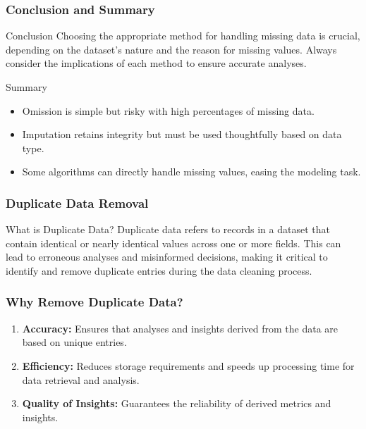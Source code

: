 \documentclass[aspectratio=169]{beamer}
\begin{document}
\begin{frame}[fragile]
    \frametitle{Conclusion and Summary}
    \begin{block}{Conclusion}
        Choosing the appropriate method for handling missing data is crucial, depending on the dataset's nature and the reason for missing values. Always consider the implications of each method to ensure accurate analyses.
    \end{block}
    
    \begin{block}{Summary}
        \begin{itemize}
            \item Omission is simple but risky with high percentages of missing data.
            \item Imputation retains integrity but must be used thoughtfully based on data type.
            \item Some algorithms can directly handle missing values, easing the modeling task.
        \end{itemize}
    \end{block}
\end{frame}

\begin{frame}[fragile]
  \frametitle{Duplicate Data Removal}
  \begin{block}{What is Duplicate Data?}
    Duplicate data refers to records in a dataset that contain identical or nearly identical values across one or more fields. This can lead to erroneous analyses and misinformed decisions, making it critical to identify and remove duplicate entries during the data cleaning process.
  \end{block}
\end{frame}

\begin{frame}[fragile]
  \frametitle{Why Remove Duplicate Data?}
  \begin{enumerate}
    \item \textbf{Accuracy:} Ensures that analyses and insights derived from the data are based on unique entries.
    \item \textbf{Efficiency:} Reduces storage requirements and speeds up processing time for data retrieval and analysis.
    \item \textbf{Quality of Insights:} Guarantees the reliability of derived metrics and insights.
  \end{enumerate}
\end{frame}
\end{document}
